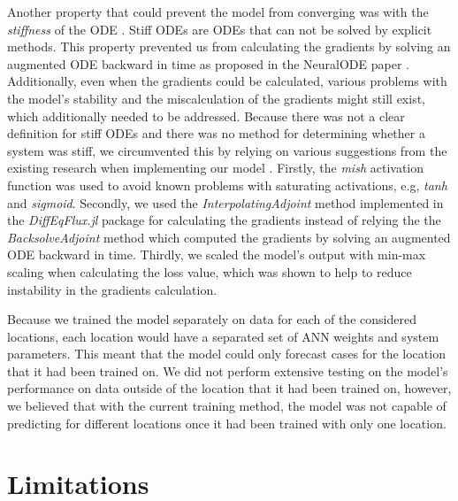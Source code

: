 Another property that could prevent the model from converging was with the \textit{stiffness} of the \gls{ODE} \cite{kimStiffNeuralOrdinary2021}.
Stiff \glspl{ODE} are \glspl{ODE} that can not be solved by explicit methods.
This property prevented us from calculating the gradients by solving an augmented \gls{ODE} backward in time as proposed in the \gls{NeuralODE} paper \cite{chenNeuralOrdinaryDifferential2019}.
Additionally, even when the gradients could be calculated, various problems with the model's stability and the miscalculation of the gradients might still exist, which additionally needed to be addressed.
Because there was not a clear definition for stiff \glspl{ODE} and there was no method for determining whether a system was stiff, we circumvented this by relying on various suggestions from the existing research when implementing our model \cite{kimStiffNeuralOrdinary2021}.
Firstly, the \textit{mish} activation function \cite{misraMishSelfRegularized2020} was used to avoid known problems with saturating activations, e.g, \textit{tanh} and \textit{sigmoid}.
Secondly, we used the \textit{InterpolatingAdjoint} method implemented in the \textit{DiffEqFlux.jl} package for calculating the gradients instead of relying the the \textit{BacksolveAdjoint} method which computed the gradients by solving an augmented \gls{ODE} backward in time.
Thirdly, we scaled the model's output with min-max scaling when calculating the loss value, which was shown to help to reduce instability in the gradients calculation.

Because we trained the model separately on data for each of the considered locations, each location would have a separated set of \gls{ANN} weights and system parameters.
This meant that the model could only forecast cases for the location that it had been trained on.
We did not perform extensive testing on the model's performance on data outside of the location that it had been trained on, however, we believed that with the current training method, the model was not capable of predicting for different locations once it had been trained with only one location.

\section{Limitations}